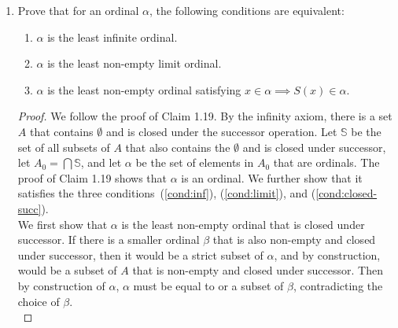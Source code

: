 \documentclass{article}
\begin{document}
\begin{enumerate}
\begin{proof}
      Now we show that $\alpha$ is the least ordinal satisfying this
      property. Let $\beta$ be an ordinal smaller than $\alpha=\cup X$. By
      Theorem 1.14.3, $\beta$ must be contained in $\alpha$, which means it
      is contained in some ordinal $x$ in $X$. By Theorem 1.14.3 again,
      $\beta$ cannot be larger or equal to $x$.
    \end{proof}

  \item Prove that for an ordinal $\alpha$, the following conditions are
    equivalent:
    \begin{enumerate}
      \item $\alpha$ is the least infinite ordinal. \label{cond:inf}
      \item $\alpha$ is the least non-empty limit ordinal.
        \label{cond:limit}
      \item $\alpha$ is the least non-empty ordinal satisfying
        $x\in\alpha\implies S(x)\in\alpha$. \label{cond:closed-succ}
    \end{enumerate}

    \begin{proof}
      We follow the proof of Claim 1.19. By the infinity axiom, there is a
      set $A$ that contains $\emptyset$ and is closed under the successor
      operation. Let $\mathbb{S}$ be the set of all subsets of $A$ that also
      contains the $\emptyset$ and is closed under successor, let
      $A_0=\bigcap\mathbb{S}$, and let $\alpha$ be the set of elements in
      $A_0$ that are ordinals. The proof of Claim 1.19 shows that $\alpha$
      is an ordinal. We further show that it satisfies the three
      conditions~(\ref{cond:inf}), (\ref{cond:limit}), and
      (\ref{cond:closed-succ}). \\

      We first show that $\alpha$ is the least non-empty ordinal that is
      closed under successor. If there is a smaller ordinal $\beta$ that is
      also non-empty and closed under successor, then it would be a
      strict subset of $\alpha$, and by construction, would be a subset of
      $A$ that is non-empty and closed under successor. Then by
      construction of $\alpha$, $\alpha$ must be equal to or a subset of
      $\beta$, contradicting the choice of $\beta$. \\


\end{proof}
\end{enumerate}
\end{document}
